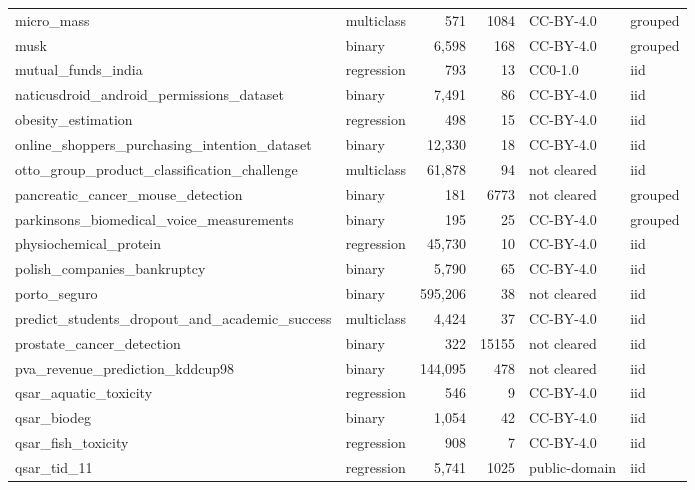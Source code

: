 \begin{longtable}{>{\raggedright\arraybackslash}p{5.5cm}lrrll}
micro\_\allowbreak{}mass & multiclass & 571 & 1084 & CC-BY-4.0 & grouped\\
musk & binary & 6,598 & 168 & CC-BY-4.0 & grouped\\
mutual\_\allowbreak{}funds\_\allowbreak{}india & regression & 793 & 13 & CC0-1.0 & iid\\
naticusdroid\_\allowbreak{}android\_\allowbreak{}permissions\_\allowbreak{}dataset & binary & 7,491 & 86 & CC-BY-4.0 & iid\\
obesity\_\allowbreak{}estimation & regression & 498 & 15 & CC-BY-4.0 & iid\\
online\_\allowbreak{}shoppers\_\allowbreak{}purchasing\_\allowbreak{}intention\_\allowbreak{}dataset & binary & 12,330 & 18 & CC-BY-4.0 & iid\\
otto\_\allowbreak{}group\_\allowbreak{}product\_\allowbreak{}classification\_\allowbreak{}challenge & multiclass & 61,878 & 94 & not cleared & iid\\
pancreatic\_\allowbreak{}cancer\_\allowbreak{}mouse\_\allowbreak{}detection & binary & 181 & 6773 & not cleared & grouped\\
parkinsons\_\allowbreak{}biomedical\_\allowbreak{}voice\_\allowbreak{}measurements & binary & 195 & 25 & CC-BY-4.0 & grouped\\
physiochemical\_\allowbreak{}protein & regression & 45,730 & 10 & CC-BY-4.0 & iid\\
polish\_\allowbreak{}companies\_\allowbreak{}bankruptcy & binary & 5,790 & 65 & CC-BY-4.0 & iid\\
porto\_\allowbreak{}seguro & binary & 595,206 & 38 & not cleared & iid\\
predict\_\allowbreak{}students\_\allowbreak{}dropout\_\allowbreak{}and\_\allowbreak{}academic\_\allowbreak{}success & multiclass & 4,424 & 37 & CC-BY-4.0 & iid\\
prostate\_\allowbreak{}cancer\_\allowbreak{}detection & binary & 322 & 15155 & not cleared & iid\\
pva\_\allowbreak{}revenue\_\allowbreak{}prediction\_\allowbreak{}kddcup98 & binary & 144,095 & 478 & not cleared & iid\\
qsar\_\allowbreak{}aquatic\_\allowbreak{}toxicity & regression & 546 & 9 & CC-BY-4.0 & iid\\
qsar\_\allowbreak{}biodeg & binary & 1,054 & 42 & CC-BY-4.0 & iid\\
qsar\_\allowbreak{}fish\_\allowbreak{}toxicity & regression & 908 & 7 & CC-BY-4.0 & iid\\
qsar\_\allowbreak{}tid\_\allowbreak{}11 & regression & 5,741 & 1025 & public-domain & iid\\

\end{longtable}
